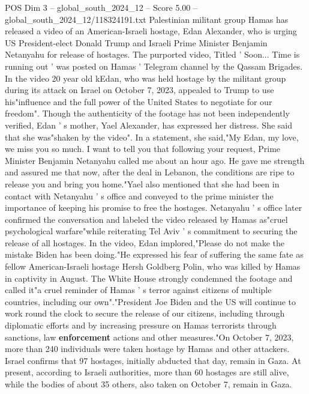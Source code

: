 \begin{textsample}{POS Dim 3 – global\_south\_2024\_12 – Score 5.00 – global\_south\_2024\_12/118324191.txt}  \label{ex:f3_pos_394}
Palestinian militant group Hamas has released a video of an American-Israeli hostage, Edan Alexander, who is urging US President-elect Donald Trump and Israeli Prime Minister Benjamin Netanyahu for release of hostages.
The purported video, Titled ' Soon...
Time is running out ' was posted on Hamas ' Telegram channel by the Qassam Brigades.
In the video 20 year old kEdan, who was held hostage by the militant group during its attack on Israel on October 7, 2023, appealed to Trump to use his"influence and the full power of the United States to negotiate for our freedom".
Though the authenticity of the footage has not been independently verified, Edan ' s mother, Yael Alexander, has expressed her distress.
She said that she was"shaken by the video".
In a statement, she said,"My Edan, my love, we miss you so much.
I want to tell you that following your request, Prime Minister Benjamin Netanyahu called me about an hour ago.
He gave me strength and assured me that now, after the deal in Lebanon, the conditions are ripe to release you and bring you home."Yael also mentioned that she had been in contact with Netanyahu ' s office and conveyed to the prime minister the importance of keeping his promise to free the hostages.
Netanyahu ' s office later confirmed the conversation and labeled the video released by Hamas as"cruel psychological warfare"while reiterating Tel Aviv ' s commitment to securing the release of all hostages.
In the video, Edan implored,"Please do not make the mistake Biden has been doing."He expressed his fear of suffering the same fate as fellow American-Israeli hostage Hersh Goldberg Polin, who was killed by Hamas in captivity in August.
The White House strongly condemned the footage and called it"a cruel reminder of Hamas ' s terror against citizens of multiple countries, including our own"."President Joe Biden and the US will continue to work round the clock to secure the release of our citizens, including through diplomatic efforts and by increasing pressure on Hamas terrorists through sanctions, law \textbf{enforcement} actions and other measures."On October 7, 2023, more than 240 individuals were taken hostage by Hamas and other attackers.
Israel confirms that 97 hostages, initially abducted that day, remain in Gaza.
At present, according to Israeli authorities, more than 60 hostages are still alive, while the bodies of about 35 others, also taken on October 7, remain in Gaza.

\end{textsample}
